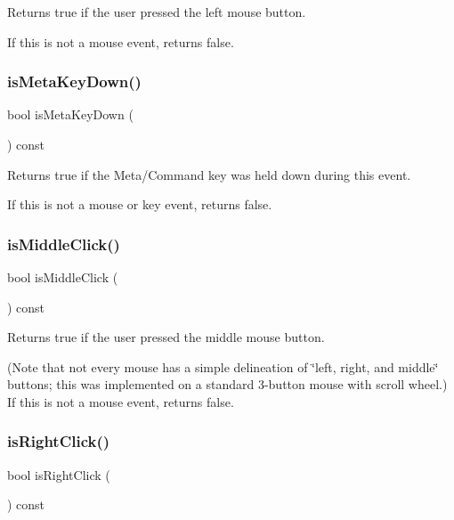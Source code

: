 Returns true if the user pressed the left mouse button. 

If this is not a mouse event, returns false. \mbox{\label{classGEvent_a37aa61a279efea6cb36cb5e6d8ada04c}} 
\subsubsection{\texorpdfstring{is\+Meta\+Key\+Down()}{isMetaKeyDown()}}
{\footnotesize\ttfamily bool is\+Meta\+Key\+Down (\begin{DoxyParamCaption}{ }\end{DoxyParamCaption}) const\hspace{0.3cm}{\ttfamily [virtual]}}



Returns {\ttfamily true} if the Meta/\+Command key was held down during this event. 

If this is not a mouse or key event, returns false. \mbox{\label{classGEvent_a92daecef1639c08c9565df591d261026}} 
\subsubsection{\texorpdfstring{is\+Middle\+Click()}{isMiddleClick()}}
{\footnotesize\ttfamily bool is\+Middle\+Click (\begin{DoxyParamCaption}{ }\end{DoxyParamCaption}) const\hspace{0.3cm}{\ttfamily [virtual]}}



Returns true if the user pressed the middle mouse button. 

(Note that not every mouse has a simple delineation of \char`\"{}left, right,
and middle\char`\"{} buttons; this was implemented on a standard 3-\/button mouse with scroll wheel.) If this is not a mouse event, returns false. \mbox{\label{classGEvent_abf4c07eef83e15984a352af91c927d3d}} 
\subsubsection{\texorpdfstring{is\+Right\+Click()}{isRightClick()}}
{\footnotesize\ttfamily bool is\+Right\+Click (\begin{DoxyParamCaption}{ }\end{DoxyParamCaption}) const\hspace{0.3cm}{\ttfamily [virtual]}}



